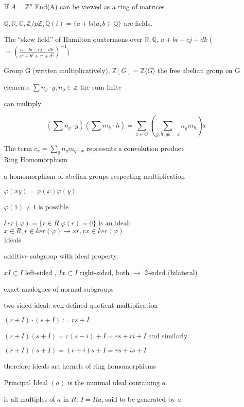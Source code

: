 \documentclass[12pt]{article}
\newcommand{\inv}{^{-1}}
\begin{document}
If $A = \mathds{Z}^n$ End(A) can be viewed as a ring of matrices

\noindent
$\mathds{Q}, \mathds{R}, \mathds{C}, \mathds{Z}/p\mathds{Z}, \mathds{Q}(i) = \{a + bi | a, b \in \mathds{Q}\}$ are fields.

\noindent
The ``skew field'' of Hamilton quaternions over $\mathds{R}, \mathds{Q}$, $a + bi + cj + dk$ ($= (\frac{a - bi - cj - dk}{a^2 + b^2 + c^2 + d^2})\inv$)

\noindent
Group G (written multiplicatively), $\mathds{Z}[G] = \mathds{Z}\langle G \rangle$ the free abelian group on G

elements $\sum n_g \cdot g, n_g \in \mathds{Z}$ the sum finite

can multiply

$$(\sum n_g \cdot g)(\sum m_h \cdot h) = \sum_{x \in G} (\sum_{g, h, gh= x}n_g m_h)x$$

The term $c_x = \sum_g n_g m_{g^{-1}x}$ represents a convolution product\\

\noindent
Ring Homomorphism

a homomorphism of abelian groups respecting multiplication

$\varphi(xy) = \varphi(x)\varphi(y)$

$\varphi(1) \neq 1$ is possible

$ker(\varphi) = \{r \in R | \varphi(r) = 0\}$ is an ideal: $x \in R, r \in ker(\varphi) \to xr, rx \in ker(\varphi)$\\

\noindent
Ideals

additive subgroup with ideal property:

$xI \subset I$ left-sided , $Ix \subset I$ right-sided, both $\to$ 2-sided (bilateral)

exact analogues of normal subgroups

\noindent
two-sided ideal: well-defined quotient multiplication

$(r + I) \cdot (s + I) := rs + I$

$(r + I)(s + I) = r(s + i) + I = rs + ri + I$ and similarly

$(r + I)(s + I) = (r + i)s + I = rs + is + I$

therefore ideals are kernels of ring homomorphisms

\noindent
Principal Ideal $(a)$ is the minimal ideal containing $a$

is all multiples of $a$ in $R$: $I = Ra$, said to be generated by $a$
\end{document}
